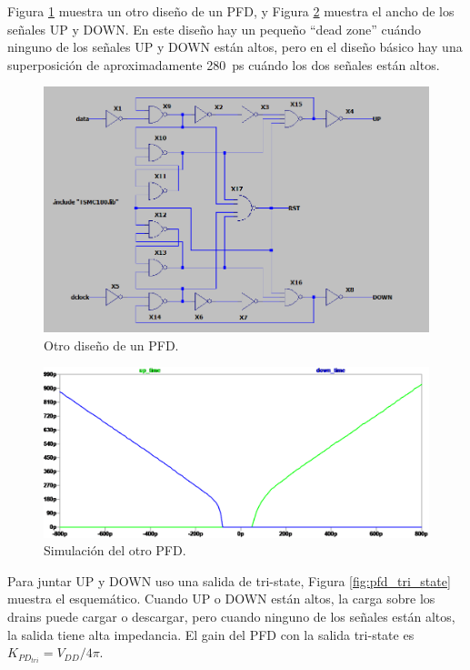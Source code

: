 \documentclass[a4paper]{article}
\begin{document}
Figura \ref{fig:pfd_v2_sch} muestra un otro diseño de un PFD, y Figura \ref{fig:pfd_v2_sim} muestra el ancho de los señales UP y DOWN. En este diseño hay un pequeño ``dead zone'' cuándo ninguno de los señales UP y DOWN están altos, pero en el diseño básico hay una superposición de aproximadamente \SI{280}{\pico\second} cuándo los dos señales están altos.
\begin{figure}[!htb]
\centering
\includegraphics[scale=0.4]{./img/pfd_v2_sch}
\caption{Otro diseño de un PFD.}
\label{fig:pfd_v2_sch}
\end{figure}

\begin{figure}[!htb]
\centering
\includegraphics[scale=0.4]{./img/pfd_v2_sim}
\caption{Simulación del otro PFD.}
\label{fig:pfd_v2_sim}
\end{figure}

Para juntar UP y DOWN uso una salida de tri-state, Figura \ref{fig:pfd_tri_state} muestra el esquemático. Cuando UP o DOWN están altos, la carga sobre los drains puede cargar o descargar, pero cuando ninguno de los señales están altos, la salida tiene alta impedancia. El gain del PFD con la salida tri-state es $K_{PD_{tri}} = V_{DD} / 4\pi$.
\end{document}
